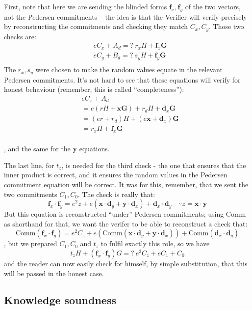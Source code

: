 \documentclass[10pt,a4paper]{article}
\begin{document}
First, note that here we are sending the blinded forms $\mathbf{f}_x, \mathbf{f}_y$ of the two
vectors, not the Pedersen commitments -- the idea is that the Verifier
will verify precisely by reconstructing the commitments and checking
they match $C_x, C_y$. Those two checks are:
\begin{align*}
& eC_x + A_d =? \ r_x H + \mathbf{f}_x \mathbf{G} \\
& eC_y + B_d =? \ s_y H + \mathbf{f}_y \mathbf{G} \\
\end{align*}
The $r_x, s_y$ were chosen to make the random values equate in the relevant
Pedersen commitments. It's not hard to see that these equations will
verify for honest behaviour (remember, this is called ``completeness''):
\begin{align*}
& eC_x + A_d \\
& = e(rH + \mathbf{xG}) + r_d H + \mathbf{d}_x \mathbf{G} \\
& = (er + r_d) H + \left(e\mathbf{x} + \mathbf{d}_x\right)\mathbf{G} \\
& = r_x H + \mathbf{f}_x \mathbf{G} \\
\end{align*}

, and the same for the \textbf{y} equations.

The last line, for $t_z$, is needed for the third check - the one that
ensures that the inner product is correct, and it ensures the random
values in the Pedersen commitment equation will be correct. It was for
this, remember, that we sent the two commitments $C_1, C_0$. The check is really
that:
\[\mathbf{f}_x \cdot \mathbf{f}_y = e^2 z + e\left(\mathbf{x} \cdot \mathbf{d}_y + \mathbf{y} \cdot \mathbf{d}_x \right) + \mathbf{d}_x \cdot \mathbf{d}_y \quad \because z = \mathbf{x} \cdot \mathbf{y}\]
But this equation is reconstructed ``under'' Pedersen commitments; using
Comm as shorthand for that, we want the verifer to be able to
reconstruct a check that:
\[\textrm{Comm}\left(\mathbf{f}_x \cdot \mathbf{f}_y\right) = e^2 C_z + e\left(\textrm{Comm}\left(\mathbf{x} \cdot \mathbf{d}_y + \mathbf{y} \cdot \mathbf{d}_x\right)\right) + \textrm{Comm}\left(\mathbf{d}_x \cdot \mathbf{d}_y \right)\]
, but we prepared $C_1, C_0$ and $t_z$ to fulfil exactly this role, so we have
\[t_z H + \left(\mathbf{f}_x \cdot \mathbf{f}_y\right)G =? \ e^2 C_z + eC_1 + C_0\]
and the reader can now easily check for himself, by simple substitution,
that this will be passed in the honest case.

\hypertarget{knowledge-soundness}{%
\subsection[Knowledge
soundness]{\texorpdfstring{\protect\hypertarget{anchor-39}{}{}Knowledge
soundness}{Knowledge soundness}}\label{knowledge-soundness}}
\end{document}
